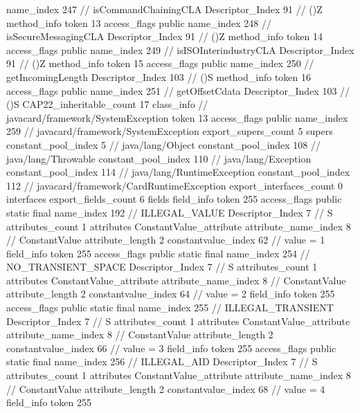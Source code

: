 {{{{{					name_index	247		// isCommandChainingCLA
					Descriptor_Index	91		// ()Z
				}
				method_info {
					token	13
					access_flags	public
					name_index	248		// isSecureMessagingCLA
					Descriptor_Index	91		// ()Z
				}
				method_info {
					token	14
					access_flags	public
					name_index	249		// isISOInterindustryCLA
					Descriptor_Index	91		// ()Z
				}
				method_info {
					token	15
					access_flags	public
					name_index	250		// getIncomingLength
					Descriptor_Index	103		// ()S
				}
				method_info {
					token	16
					access_flags	public
					name_index	251		// getOffsetCdata
					Descriptor_Index	103		// ()S
				}
			}
			CAP22_inheritable_count	17
		}
		class_info {		// javacard/framework/SystemException
			token	13
			access_flags	public
			name_index	259		// javacard/framework/SystemException
			export_supers_count	5
			supers {
				constant_pool_index	5		// java/lang/Object
				constant_pool_index	108		// java/lang/Throwable
				constant_pool_index	110		// java/lang/Exception
				constant_pool_index	114		// java/lang/RuntimeException
				constant_pool_index	112		// javacard/framework/CardRuntimeException
			}
			export_interfaces_count	0
			interfaces {
			}
			export_fields_count	6
			fields {
			field_info {
				token	255
				access_flags	public static final
				name_index	192		// ILLEGAL_VALUE
				Descriptor_Index	7		// S
				attributes_count	1
				attributes {
				ConstantValue_attribute {
					attribute_name_index	8		// ConstantValue
					attribute_length	2
					constantvalue_index	62		// value = 1
				}
				}
			}
			field_info {
				token	255
				access_flags	public static final
				name_index	254		// NO_TRANSIENT_SPACE
				Descriptor_Index	7		// S
				attributes_count	1
				attributes {
				ConstantValue_attribute {
					attribute_name_index	8		// ConstantValue
					attribute_length	2
					constantvalue_index	64		// value = 2
				}
				}
			}
			field_info {
				token	255
				access_flags	public static final
				name_index	255		// ILLEGAL_TRANSIENT
				Descriptor_Index	7		// S
				attributes_count	1
				attributes {
				ConstantValue_attribute {
					attribute_name_index	8		// ConstantValue
					attribute_length	2
					constantvalue_index	66		// value = 3
				}
				}
			}
			field_info {
				token	255
				access_flags	public static final
				name_index	256		// ILLEGAL_AID
				Descriptor_Index	7		// S
				attributes_count	1
				attributes {
				ConstantValue_attribute {
					attribute_name_index	8		// ConstantValue
					attribute_length	2
					constantvalue_index	68		// value = 4
				}
				}
			}
			field_info {
				token	255
}}}}}
